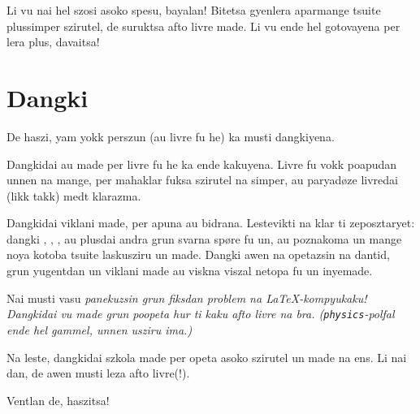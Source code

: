 Li vu nai hel szosi asoko spesu, bayalan! Bitetsa gyenlera aparmange tsuite
plussimper szirutel, de suruktsa afto livre made. Li vu ende hel gotovayena
per lera plus, davaitsa!


\section{Dangki}
De haszi, yam yokk perszun (au livre fu he) ka musti dangkiyena.

Dangkidai  au  made per livre fu he
ka ende kakuyena. Livre fu vokk poapudan unnen na mange, per mahaklar
fuksa szirutel na simper, au paryadøze livredai (likk takk) medt klarazma.

Dangkidai  viklani made, per apuna au bidrana. Lestevikti na
klar ti  zeposztaryet: dangki , ,
, au plusdai andra grun svarna spøre fu un, au poznakoma un
mange noya kotoba tsuite laskusziru un made. Dangki awen na  opetazsin na
dantid, grun yugentdan un viklani made au viskna viszal netopa fu un inyemade.

Nai musti vasu \it{panekuzsin} grun fiksdan problem na \LaTeX-kompyukaku! Dangkidai
vu made grun poopeta hur ti kaku afto livre na bra. (\texttt{physics}-polfal ende
hel gammel, unnen usziru ima.)

Na leste, dangkidai szkola made per opeta asoko szirutel un made na ens. Li nai dan,
de awen musti leza afto livre(!).

\begin{center}
  Ventlan de, haszitsa!
\end{center}
